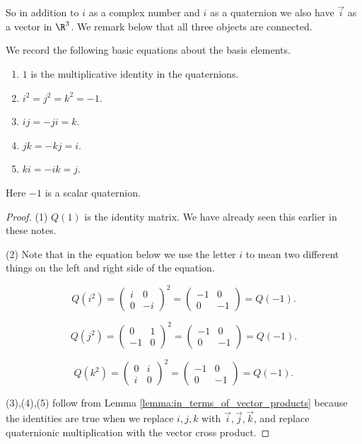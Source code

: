 \documentclass[oneside,12pt]{amsart}
\begin{document}
\begin{note}
So in addition to $i$ as a complex number and $i$ as a quaternion we also have $\vec{i}$
as a vector in $\R^3$. We remark below that all three objects are connected.
\end{note}

\begin{lemma} We record the following basic equations about the basis elements.
\label{lemma:basic_equations}
\begin{enumerate}
\item $1$ is the multiplicative identity in the quaternions.
\item $i^2=j^2=k^2 = -1$.
\item $ij = -ji = k$.
\item $jk = -kj = i$.
\item $ki = -ik = j$.
\end{enumerate}
Here $-1$ is a scalar quaternion.
\end{lemma}
\begin{proof}
(1) $Q(1)$ is the identity matrix. We have already seen this
earlier in these notes.

(2) Note that in the equation below we use the letter $i$ to mean two different things
on the left and right side of the equation.

$$Q(i^2) = \begin{pmatrix}i & 0 \\ 0 & -i\end{pmatrix}^2 = \begin{pmatrix}-1 & 0 \\ 0 & -1\end{pmatrix} = Q(-1).$$

$$Q(j^2) = \begin{pmatrix}0 & 1 \\ -1 & 0\end{pmatrix}^2 = \begin{pmatrix}-1 & 0 \\ 0 & -1\end{pmatrix} = Q(-1).$$

$$Q(k^2) = \begin{pmatrix}0 & i \\ i & 0\end{pmatrix}^2 = \begin{pmatrix}-1 & 0 \\ 0 & -1\end{pmatrix} = Q(-1).$$

(3),(4),(5) follow from Lemma \ref{lemma:in_terms_of_vector_products} because the identities are true when we
 replace $i,j,k$ with $\vec{i},\vec{j},\vec{k}$, and replace quaternionic multiplication with the vector cross product.
 \end{proof}
\end{document}
